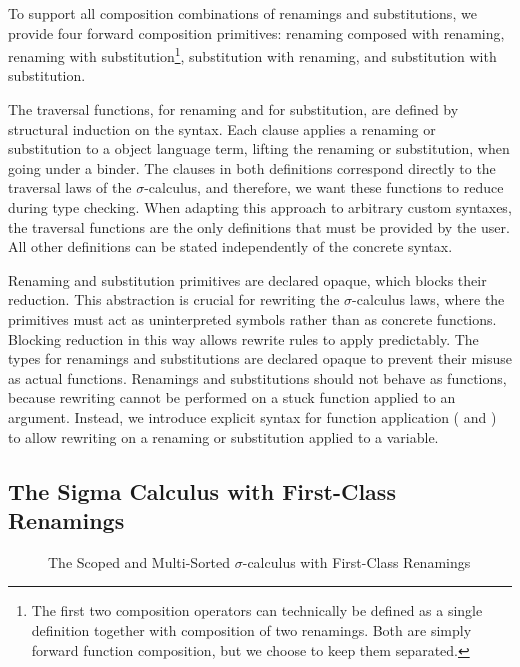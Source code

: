\documentclass[screen,nonacm]{acmart}
\begin{document}
To support all composition combinations of renamings and substitutions, we
provide four forward composition primitives: renaming composed with renaming,
renaming with substitution\footnote{The first two composition operators can
      technically be defined as a single definition together with composition of two
      renamings. Both are simply forward function composition, but we choose to keep
      them separated.}, substitution with renaming, and substitution with
substitution.

The traversal functions,  for renaming and
 for substitution, are defined by structural induction on
the syntax. Each clause applies a renaming or substitution to a object language
term, lifting the renaming or substitution, when going under a binder. The
clauses in both definitions correspond directly to the traversal laws of the
$σ$-calculus, and therefore, we want these functions to reduce during type
checking. When adapting this approach to arbitrary custom syntaxes, the
traversal functions are the only definitions that must be provided by the user.
All other definitions can be stated independently of the concrete syntax.

Renaming and substitution primitives are declared opaque, which blocks their
reduction. This abstraction is crucial for rewriting the $σ$-calculus laws,
where the primitives must act as uninterpreted symbols rather than as concrete
functions. Blocking reduction in this way allows rewrite rules to apply
predictably. The types for renamings and substitutions are declared opaque to
prevent their misuse as actual functions. Renamings and substitutions should
not behave as functions, because rewriting cannot be performed on a stuck
function applied to an argument. Instead, we introduce explicit syntax for
function application ( and ) to
allow rewriting on a renaming or substitution applied to a variable.

\subsection{The Sigma Calculus with First-Class Renamings}\label{sec:mis-sig}
\begin{figure}[t]
      \centering

      \begin{minipage}[t]{0.38\linewidth}
            \raggedright{}
            \EDefLaws{}
            \ERewriteSys{}
            \ERewriteSysT{}
      \end{minipage}
      \hfill
      \begin{minipage}[t]{0.58\linewidth}
            \raggedright{}
            \EInteractLaws{}
            \EMonadLaws{}
      \end{minipage}
      \caption{The Scoped and Multi-Sorted $σ$-calculus with First-Class Renamings}\label{fig:mis-sig}
\end{figure}
\end{document}
